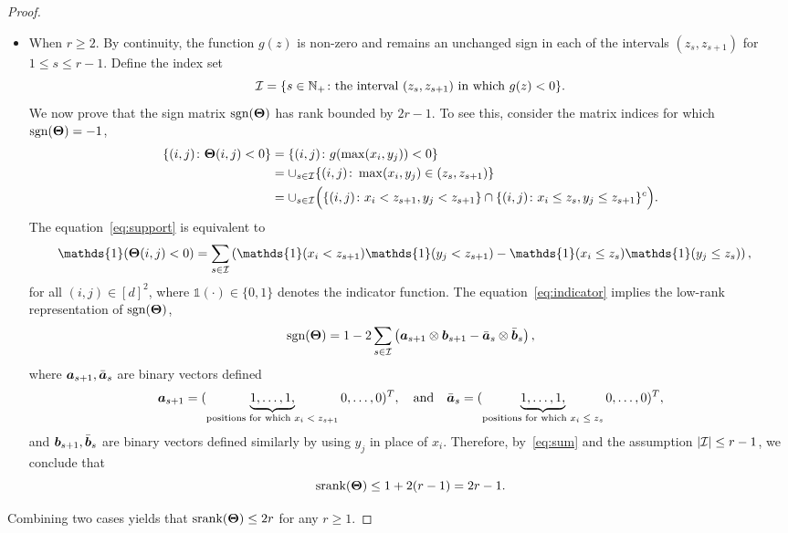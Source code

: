 \documentclass[11pt]{article}
\newcommand*{\KeepStyleUnderBrace}[1]{%
\mathop{%
\mathchoice
{\underbrace{\displaystyle#1}}%
{\underbrace{\textstyle#1}}%
{\underbrace{\scriptstyle#1}}%
{\underbrace{\scriptscriptstyle#1}}%
}\limits
}
\theoremstyle{plain}
\theoremstyle{definition}
\def\sign{\textup{sgn}}
\def\srank{\textup{srank}}
\begin{document}
\begin{proof}
\begin{itemize}[leftmargin=*,topsep=0pt,itemsep=-1ex,partopsep=1ex,parsep=1ex]
\item When $r\geq 2$. By continuity, the function $g(z)$ is non-zero and remains an unchanged sign in each of the intervals $(z_s, z_{s+1})$ for $1\leq s\leq r-1$. Define the index set 
\[
\mathcal{I}=\{s\in\mathbb{N}_{+}\colon \text{the interval $(z_s, z_{s+1})$ in which $g(z)<0$}\}.
\] 
We now prove that the sign matrix $\sign(\mTheta)$ has rank bounded by $2r-1$. To see this, consider the matrix indices for which $\sign(\mTheta)=-1$,
\begin{align}\label{eq:support}
\{(i,j)\colon \bm{\Theta}(i,j) <0 \} & = \{(i,j) \colon g(\max(x_i,y_j))<0\} \notag \\
&=\cup_{s\in \mathcal{I}} \{(i,j)\colon \max(x_i,y_j)\in(z_s,z_{s+1})\}\notag\\
&=\cup_{s\in \mathcal{I}}\Big( \{(i,j)\colon x_{i}< z_{s+1}, y_j<z_{s+1}\} \cap \{(i,j)\colon x_{i}\leq z_{s}, y_j\leq z_{s+1}\}^c\Big).
\end{align}
The equation~\eqref{eq:support} is equivalent to 
\begin{align}\label{eq:indicator}
\mathds{1}(\mTheta(i,j)< 0)&
=\sum_{s\in \tI}\left(  \mathds{1}(x_{i}< z_{s+1}) \mathds{1}(y_{j}< z_{s+1})- \mathds{1}(x_{i}\leq z_{s})\mathds{1}(y_{j}\leq z_{s})\right),
\end{align}
for all $(i,j)\in[d]^2$, where $\mathds{1}(\cdot)\in\{0,1\}$ denotes the indicator function. The equation~\eqref{eq:indicator} implies the low-rank representation of $\sign(\mTheta)$,
\begin{equation}\label{eq:sum}
\sign(\mTheta)=1-2\sum_{s\in \tI } \left(\ma_{s+1}\otimes \mb_{s+1} - \bar \ma_s\otimes \bar \mb_s\right),
\end{equation}
where $\bm{a}_{s+1}, \bar {\bm{a}}_{s}$ are binary vectors defined
\[
\ma_{s+1}=(\KeepStyleUnderBrace{1,\ldots,1,}_{\text{positions for which $x_{i}<z_{s+1}$}}0,\ldots,0)^T,\quad \text{and}\quad
\bar \ma_s=(\KeepStyleUnderBrace{1,\ldots,1,}_{\text{positions for which $x_{i}\leq z_{s}$}}0,\ldots,0)^T,
\]
and $\bm{b}_{s+1}, \bar {\bm{b}}_{s}$ are binary vectors defined similarly by using $y_j$ in place of $x_i$. 
Therefore, by~\eqref{eq:sum} and the assumption $|\mathcal{I}|\leq r-1$, we conclude that 
\[
\srank(\mTheta)\leq 1+2(r-1)=2r-1.
\]
\end{itemize}
Combining two cases yields that $\srank(\mTheta)\leq 2r$ for any $r\geq 1$.
\end{proof}
\end{document}
